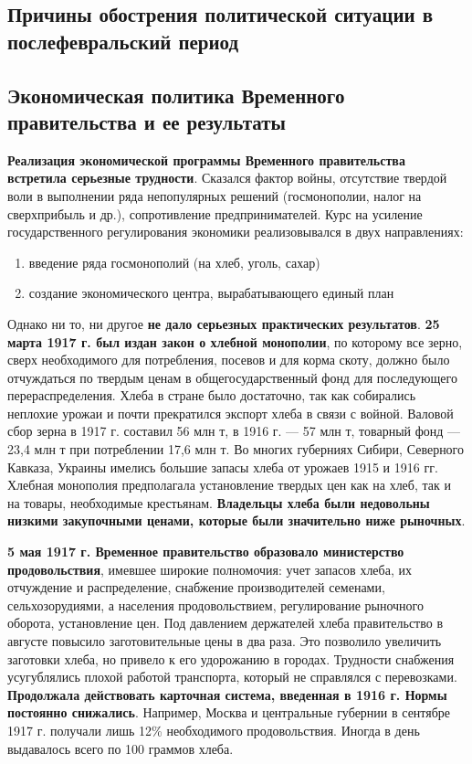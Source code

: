 \documentclass{article}
\begin{document}
\subsection{Причины обострения политической ситуации в послефевральский период}

\pagebreak
\subsection{Экономическая политика Временного правительства и ее результаты}

\textbf{Реализация экономической программы Временного правительства встретила серьезные трудности}. Сказался фактор войны, отсутствие твердой воли в выполнении ряда непопулярных решений (госмонополии, налог на сверхприбыль и др.), сопротивление предпринимателей. Курс на усиление государственного регулирования экономики реализовывался в двух направлениях:

\begin{enumerate}
    \item введение ряда госмонополий (на хлеб, уголь, сахар)
    \item создание экономического центра, вырабатывающего единый план
\end{enumerate}

Однако ни то, ни другое \textbf{не дало серьезных практических результатов}. \textbf{25 марта 1917 г. был издан закон о хлебной монополии}, по которому все зерно, сверх необходимого для потребления, посевов и для корма скоту, должно было отчуждаться по твердым ценам в общегосударственный фонд для последующего перераспределения. Хлеба в стране было достаточно, так как собирались неплохие урожаи и почти прекратился экспорт хлеба в связи с войной. Валовой сбор зерна в 1917 г. составил 56 млн т, в 1916 г. — 57 млн т, товарный фонд — 23,4 млн т при потреблении 17,6 млн т. Во многих губерниях Сибири, Северного Кавказа, Украины имелись большие запасы хлеба от урожаев 1915 и 1916 гг. Хлебная монополия предполагала установление твердых цен как на хлеб, так и на товары, необходимые крестьянам. \textbf{Владельцы хлеба были недовольны низкими закупочными ценами, которые были значительно ниже рыночных}.

\hfill

\textbf{5 мая 1917 г. Временное правительство образовало министерство продовольствия}, имевшее широкие полномочия: учет запасов хлеба, их отчуждение и распределение, снабжение производителей семенами, сельхозорудиями, а населения продовольствием, регулирование рыночного оборота, установление цен. Под давлением держателей хлеба правительство в августе повысило заготовительные цены в два раза. Это позволило увеличить заготовки хлеба, но привело к его удорожанию в городах. Трудности снабжения усугублялись плохой работой транспорта, который не справлялся с перевозками. \textbf{Продолжала действовать карточная система, введенная в 1916 г. Нормы постоянно снижались}. Например, Москва и центральные губернии в сентябре 1917 г. получали лишь 12\% необходимого продовольствия. Иногда в день выдавалось всего по 100 граммов хлеба.
\end{document}
